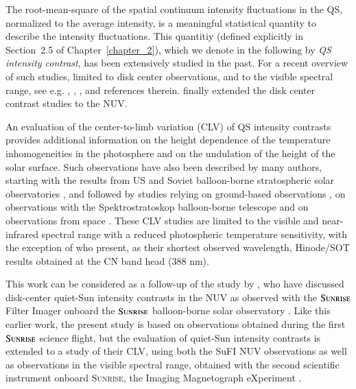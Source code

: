 \documentclass[goettingen, gauss, print]{thesis}
\begin{document}
The root-mean-square of the spatial continuum intensity fluctuations in the QS, normalized to the average intensity, is a meaningful statistical quantity to describe the intensity fluctuations. This quantitiy (defined explicitly in Section~2.5 of Chapter~\ref{chapter_2}), which we denote in the following by \emph{QS intensity contrast}, has been extensively studied in the past. For a recent overview of such studies, limited to disk center observations, and to the visible spectral range, see e.g. \cite{sanchez_cuberes_center--limb_2000}, \cite{danilovic_intensity_2008}, \cite{mathew_stray_2009}, and references therein. \cite{hirzberger_quiet-sun_2010} finally extended the disk center contrast studies to the NUV. 

An evaluation of the center-to-limb variation (CLV) of QS intensity contrasts provides additional information on the height dependence of the temperature inhomogeneities in the photosphere and on the undulation of the height of the solar surface. Such observations have also been described by many authors, starting with the results from US and Soviet balloon-borne stratospheric solar observatories \citep{edmonds_statistical_1962, pravdyuk_distribution_1974}, and followed by studies relying on ground-based observations \citep{keil_new_1977, schmidt_center_1979, druesne_speckle_1989, wilken_speckle_1997, sanchez_almeida_physical_2000, sanchez_cuberes_centre--limb_2003}, on observations with the Spektrostratoskop balloon-borne telescope \citep{schmidt_center_1979, durrant_balloon-borne_1983} and on observations from space \citep{zakharov_diagnostic_2006, wedemeyer-bohm_continuum_2009, afram_intensity_2011, yeo_point_2014}. These CLV studies are limited to the visible and near-infrared spectral range with a reduced photospheric temperature sensitivity, with the exception of \cite{afram_intensity_2011} who present, as their shortest observed wavelength, Hinode/SOT results obtained at the CN band head (388 nm).

This work can be considered as a follow-up of the study by \cite{hirzberger_performance_2011}, who have discussed disk-center quiet-Sun intensity contrasts in the NUV as observed with the $\textsc{Sunrise}$ Filter Imager \citep[SuFI; see][]{gandorfer_filter_2011} onboard the $\textsc{Sunrise}$ balloon-borne solar observatory \citep{barthol_sunrise_2011, solanki_sunrise:_2010, solanki_second_2017}. Like this earlier work, the present study is based on observations obtained during the first $\textsc{Sunrise}$ science flight, but the evaluation of quiet-Sun intensity contrasts is extended to a study of their CLV, using both the SuFI NUV observations as well as observations in the visible spectral range, obtained with the second scientific instrument onboard \textsc{Sunrise}, the Imaging Magnetograph eXperiment \citep[IMaX; see][]{martinezpillet_imaging_2011}. 
\end{document}
